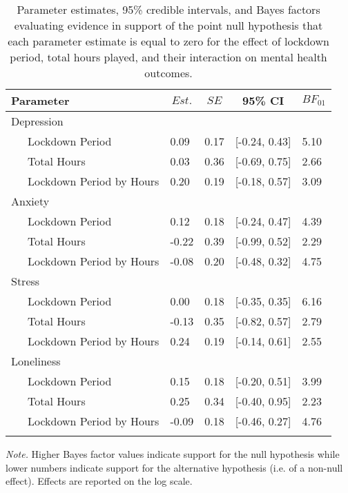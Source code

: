\documentclass[
  english,
  man,floatsintext]{apa6}
\begin{document}
\begin{table}[!htbp]

\begin{center}
\begin{threeparttable}

\caption{\label{tab:study-three-mh-bayes-pre-post}Parameter estimates, 95\% credible intervals, and Bayes factors evaluating evidence in support of the point null hypothesis that each parameter estimate is equal to zero for the effect of lockdown period, total hours played, and their interaction on mental health outcomes.}

\begin{tabular}{lllll}
\toprule
Parameter & \multicolumn{1}{c}{$Est.$} & \multicolumn{1}{c}{$SE$} & \multicolumn{1}{c}{95\% CI} & \multicolumn{1}{c}{$BF_{01}$}\\
\midrule
Depression &  &  &  & \\
\ \ \ Lockdown Period & 0.09 & 0.17 & {}[-0.24, 0.43] & 5.10\\
\ \ \ Total Hours & 0.03 & 0.36 & {}[-0.69, 0.75] & 2.66\\
\ \ \ Lockdown Period by Hours & 0.20 & 0.19 & {}[-0.18, 0.57] & 3.09\\
Anxiety &  &  &  & \\
\ \ \ Lockdown Period & 0.12 & 0.18 & {}[-0.24, 0.47] & 4.39\\
\ \ \ Total Hours & -0.22 & 0.39 & {}[-0.99, 0.52] & 2.29\\
\ \ \ Lockdown Period by Hours & -0.08 & 0.20 & {}[-0.48, 0.32] & 4.75\\
Stress &  &  &  & \\
\ \ \ Lockdown Period & 0.00 & 0.18 & {}[-0.35, 0.35] & 6.16\\
\ \ \ Total Hours & -0.13 & 0.35 & {}[-0.82, 0.57] & 2.79\\
\ \ \ Lockdown Period by Hours & 0.24 & 0.19 & {}[-0.14, 0.61] & 2.55\\
Loneliness &  &  &  & \\
\ \ \ Lockdown Period & 0.15 & 0.18 & {}[-0.20, 0.51] & 3.99\\
\ \ \ Total Hours & 0.25 & 0.34 & {}[-0.40, 0.95] & 2.23\\
\ \ \ Lockdown Period by Hours & -0.09 & 0.18 & {}[-0.46, 0.27] & 4.76\\
\bottomrule
\addlinespace
\end{tabular}

\begin{tablenotes}[para]
\normalsize{\textit{Note.} Higher Bayes factor values indicate support for the null hypothesis while lower numbers indicate support for the alternative hypothesis (i.e. of a non-null effect). Effects are reported on the log scale.}
\end{tablenotes}

\end{threeparttable}
\end{center}

\end{table}
\end{document}
